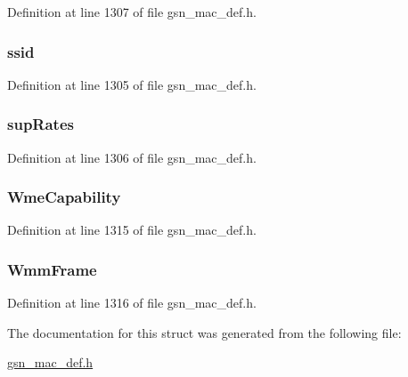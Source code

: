 Definition at line 1307 of file gsn\_\-mac\_\-def.h.

\hypertarget{a00111_a1bc7788a828e29446580aa10a5ac2932}{
\subsubsection[{ssid}]{ {\bf ssid}}}
\label{a00111_a1bc7788a828e29446580aa10a5ac2932}


Definition at line 1305 of file gsn\_\-mac\_\-def.h.

\hypertarget{a00111_ae8f1cc25d29a229c47940e7330b99ffc}{
\subsubsection[{supRates}]{ {\bf supRates}}}
\label{a00111_ae8f1cc25d29a229c47940e7330b99ffc}


Definition at line 1306 of file gsn\_\-mac\_\-def.h.

\hypertarget{a00111_a21329babf9e9d1788fb070dd700305e0}{
\subsubsection[{WmeCapability}]{ {\bf WmeCapability}}}
\label{a00111_a21329babf9e9d1788fb070dd700305e0}


Definition at line 1315 of file gsn\_\-mac\_\-def.h.

\hypertarget{a00111_a6e19d8a2da8f80de97e4acdb50ab2b7d}{
\subsubsection[{WmmFrame}]{ {\bf WmmFrame}}}
\label{a00111_a6e19d8a2da8f80de97e4acdb50ab2b7d}


Definition at line 1316 of file gsn\_\-mac\_\-def.h.



The documentation for this struct was generated from the following file:\begin{DoxyCompactItemize}
\item 
\hyperlink{a00522}{gsn\_\-mac\_\-def.h}\end{DoxyCompactItemize}
